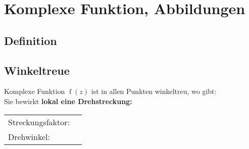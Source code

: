 \section{Komplexe Funktion, Abbildungen}
	\begin{minipage}[t]{0.5\textwidth}
		\subsection{Definition}
	\end{minipage}
	\begin{minipage}[t]{0.5\textwidth}
		\subsection{Winkeltreue}
			Komplexe Funktion $\operatorname{f}\left( z \right)$ ist in allen Punkten winkeltreu, wo gibt: \\[6pt]
			Sie bewirkt \textbf{lokal eine Drehstreckung:}\\[3pt]
			\begin{tabular}{ll}
				Streckungsfaktor: & \fbox{$\left|f^{\prime}(z)\right|$}\\[3pt]
				Drehwinkel: & \fbox{$\operatorname{\arg}\left( z \right)$}\\[3pt]
			\end{tabular}
	\end{minipage}
